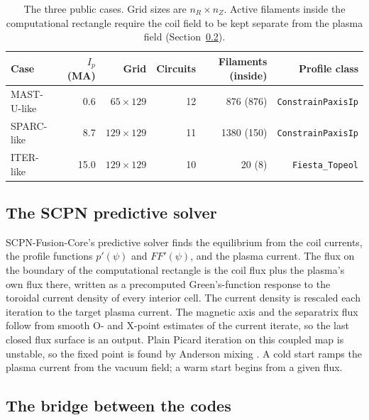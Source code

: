 \documentclass[11pt]{article}
\begin{document}
\begin{table}[ht]
\centering
\caption{The three public cases.  Grid sizes are $n_R \times n_Z$.  Active
filaments inside the computational rectangle require the coil field to be kept
separate from the plasma field (Section~\ref{sec:bridge}).}
\label{tab:cases}
\begin{tabular}{lrrrrr}
\toprule
Case & $I_p$ (MA) & Grid & Circuits & Filaments (inside) & Profile class \\
\midrule
MAST-U-like & 0.6 & $65 \times 129$ & 12 & 876 (876) & \texttt{ConstrainPaxisIp} \\
SPARC-like & 8.7 & $129 \times 129$ & 11 & 1380 (150) & \texttt{ConstrainPaxisIp} \\
ITER-like & 15.0 & $129 \times 129$ & 10 & 20 (8) & \texttt{Fiesta\_Topeol} \\
\bottomrule
\end{tabular}
\end{table}

\subsection{The SCPN predictive solver}

SCPN-Fusion-Core's predictive solver finds the equilibrium from the coil
currents, the profile functions $p'(\psi)$ and $FF'(\psi)$, and the plasma
current.  The flux on the boundary of the computational rectangle is the coil
flux plus the plasma's own flux there, written as a precomputed Green's-function
response to the toroidal current density of every interior cell.  The current
density is rescaled each iteration to the target plasma current.  The magnetic
axis and the separatrix flux follow from smooth O- and X-point estimates of the
current iterate, so the last closed flux surface is an output.  Plain Picard
iteration on this coupled map is unstable, so the fixed point is found by
Anderson mixing \citep{Anderson1965,WalkerNi2011}.  A cold start ramps the
plasma current from the vacuum field; a warm start begins from a given flux.

\subsection{The bridge between the codes}
\label{sec:bridge}
\end{document}
